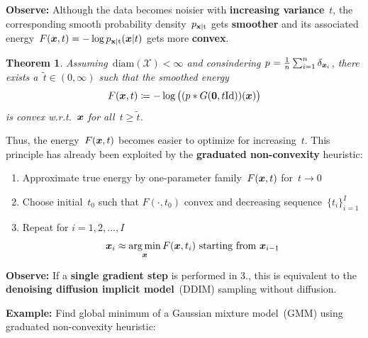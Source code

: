 \documentclass[a1paper,fleqn]{betterportraitposter}
\renewcommand{\emph}[1]{\textbf{\color{myblue}#1}}
\newcommand{\X}{\mathcal{X}}
\newcommand{\id}{\mathrm{Id}}
\renewcommand{\vec}[1]{\mathbf{#1}}
\newcommand{\diameter}{\mathrm{diam}}
\newcommand{\pdf}[1]{p_{#1}}
\theoremstyle{plain}
\newtheorem{theorem}{Theorem}
\begin{document}
{\begin{multicols}{2}
\textbf{Observe:}
Although the data becomes noisier with \emph{increasing variance}~$t$, the corresponding smooth probability density~$\pdf{\rvx\vert\rt}$ gets \emph{smoother} and its associated energy~$F(\vx,t)=-\log\pdf{\rvx\vert\rt}(\vx\vert t)$ gets more \emph{convex}.\\[-1em]

\begin{theorem}
Assuming~$\diameter(\X)<\infty$ and consindering $\pdf{}=\frac{1}{n}\sum_{i=1}^n \delta_{\vx_i}$, there exists a~$\widetilde{t}\in(0,\infty)$ such that the smoothed energy
\[
F(\vx,t)\coloneqq -\log \big( (p \ast G(\vec{0}, t\id))(\vx)\big)
\]
is convex w.r.t.~${\bm{x}}$ for all~$t\geq\widetilde{t}$.
\end{theorem}

Thus, the energy~$F({\bm{x}},t)$ becomes easier to optimize for increasing~$t$.
This principle has already been exploited by the \emph{graduated non-convexity} heuristic:
\begin{enumerate}
\item Approximate true energy by one-parameter family~$F({\bm{x}},t)$ for~$t\to0$
\item Choose initial~$t_0$ such that $F(\cdot,t_0)$ convex and decreasing sequence~$\{t_i\}_{i=1}^I$
\item Repeat for $i=1,2,\ldots,I$
\[
    {\bm{x}}_i \approx \operatorname*{arg\,min}_{\bm{x}} F({\bm{x}},t_i) \text{ starting from } {\bm{x}}_{i-1}
\]
\end{enumerate}

\textbf{Observe:}
If a \emph{single gradient step} is performed in 3., this is equivalent to the \emph{denoising diffusion implicit model}~(DDIM) sampling without diffusion.

\vspace*{1em}
\textbf{Example:}
Find global minimum of a Gaussian mixture model~(GMM) using graduated non-convexity heuristic:


\end{multicols}}
\end{document}
